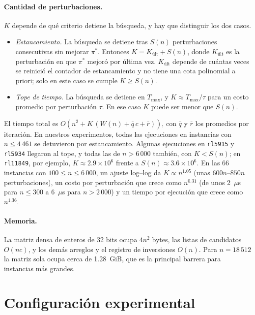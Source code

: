 \documentclass[runningheads]{llncs}
\begin{document}
\paragraph{Cantidad de perturbaciones.} $K$ depende de qué criterio
detiene la búsqueda, y hay que distinguir los dos casos.
\begin{itemize}
  \item \emph{Estancamiento.} La búsqueda se detiene tras $S(n)$
    perturbaciones consecutivas sin mejorar $\pi^*$. Entonces
    $K=K_{\mathrm{últ}}+S(n)$, donde $K_{\mathrm{últ}}$ es la
    perturbación en que $\pi^*$ mejoró por última vez.
    $K_{\mathrm{últ}}$ depende de cuántas veces se reinició el contador
    de estancamiento y no tiene una cota polinomial a priori; solo en este
    caso se cumple $K\ge S(n)$.
  \item \emph{Tope de tiempo.} La búsqueda se detiene en $T_{\max}$, y
    $K\approx T_{\max}/\tau$ para un costo promedio por perturbación
    $\tau$. En ese caso $K$ puede ser menor que $S(n)$.
\end{itemize}
El tiempo total es $O(n^2+K\,(W(n)+\bar q\,c+\bar r))$, con $\bar q$ y
$\bar r$ los promedios por iteración. En nuestros experimentos, todas las
ejecuciones en instancias con $n\le 4\,461$ se detuvieron por
estancamiento. Algunas ejecuciones en \texttt{rl5915} y \texttt{rl5934}
llegaron al tope, y todas las de $n>6\,000$ también, con $K<S(n)$; en
\texttt{rl11849}, por ejemplo, $K\approx 2.9\times10^6$ frente a
$S(n)\approx 3.6\times10^6$. En las 66 instancias con
$100\le n\le 6\,000$, un ajuste log--log da $K\propto n^{1.05}$ (unas
$600n$--$850n$ perturbaciones), un costo por perturbación que crece como
$n^{0.31}$ (de unos 2~$\mu$s para $n\le 300$ a 6~$\mu$s para
$n>2\,000$) y un tiempo por ejecución que crece como $n^{1.36}$.

\paragraph{Memoria.} La matriz densa de enteros de 32 bits ocupa $4n^2$
bytes, las listas de candidatos $O(nc)$, y los demás arreglos y el
registro de inversiones $O(n)$. Para $n=18\,512$ la matriz sola ocupa
cerca de 1.28~GiB, que es la principal barrera para instancias más
grandes.

\section{Configuración experimental}
\label{sec:setup}
\end{document}

